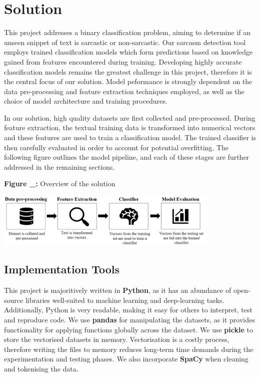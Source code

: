 \documentclass[12pt,a4paper]{article}
\begin{document}
\section{Solution}
\noindent This project addresses a binary classification problem, aiming to determine if an unseen snippet of text is sarcastic or non-sarcastic. Our sarcasm detection tool employs trained classification models which form  predictions based on knowledge gained from features encountered during training. Developing highly accurate classification models remains the greatest challenge in this project, therefore it is the central focus of our solution. Model peformance is strongly dependent on the data pre-processing and feature extraction techniques employed, as well as the choice of model architecture and training procedures. 

In our solution, high quality datasets are first collected and pre-processed. During feature extraction, the textual training data is transformed into numerical vectors and these features are used to train a classification model. The trained classifier is then carefully evaluated in order to account for potential overfitting. The following figure outlines the model pipeline, and each of these stages are further addressed in the remaining sections.


\begin{center}
	\textbf{Figure \_:} Overview of the solution
\end{center}
\begin{center}
	\includegraphics[width=0.8\textwidth]{Images/modelpipeline2.png}
	\label{Model Pipeline}
\end{center}

\subsection{Implementation Tools}
\noindent This project is majoritively written in \textbf{Python}, as it has an abundance of open-source libraries well-suited to machine learning and deep-learning tasks. Additionally, Python is very readable, making it easy for others to interpret, test and reproduce code. We use \textbf{pandas} for manipulating the datasets, as it provides functionality for applying functions globally across the dataset. We use \textbf{pickle} to store the vectorised datasets in memory. Vectorisation is a costly process, therefore writing the files to memory reduces long-term time demands during the experimentation and testing phases. We also  incorporate \textbf{SpaCy} when cleaning and tokenising the data.
\end{document}
